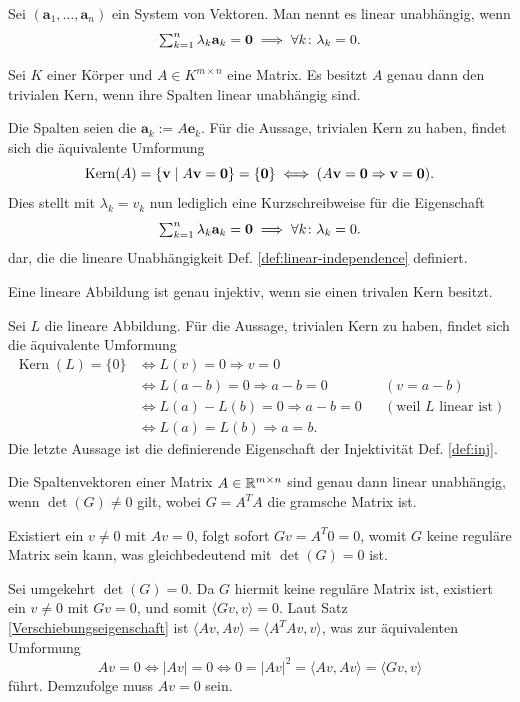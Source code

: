 \begin{Definition}\label{def:linear-independence}
Sei $(\mathbf a_1,\ldots, \mathbf a_n)$ ein System von Vektoren.
Man nennt es linear unabhängig, wenn
\[\textstyle\sum_{k=1}^n \lambda_k\mathbf{a}_k = \mathbf{0}
\implies \forall k\colon\lambda_k = 0.\]
\end{Definition}

\begin{Satz}
Sei $K$ einer Körper und $A\in K^{m\times n}$ eine Matrix. Es besitzt
$A$ genau dann den trivialen Kern, wenn ihre Spalten linear
unabhängig sind.
\end{Satz}
\begin{Beweis} Die Spalten seien die $\mathbf a_k := A\mathbf e_k$.
Für die Aussage, trivialen Kern zu haben, findet sich die
äquivalente Umformung
\[\operatorname{Kern}(A) = \{\mathbf v\mid A\mathbf{v} = \mathbf{0}\} = \{\mathbf{0}\}
\iff (A\mathbf{v} = \mathbf{0} \Rightarrow \mathbf{v} = \mathbf{0}).\]
Dies stellt mit $\lambda_k = v_k$ nun lediglich eine Kurzschreibweise
für die Eigenschaft
\[\textstyle\sum_{k=1}^n \lambda_k\mathbf{a}_k = \mathbf{0}\implies \forall k\colon\lambda_k = 0.\]
dar, die die lineare Unabhängigkeit Def. \ref{def:linear-independence}
definiert.\,\qedsymbol
\end{Beweis}

\begin{Satz}
Eine lineare Abbildung ist genau injektiv, wenn sie einen trivalen
Kern besitzt.
\end{Satz}
\begin{Beweis} Sei $L$ die lineare Abbildung. Für die Aussage,
trivialen Kern zu haben, findet sich die äquivalente Umformung
\begin{align*}
\operatorname{Kern}(L) = \{0\}
&\iff L(v) = 0\Rightarrow v = 0\\
&\iff L(a-b) = 0\Rightarrow a - b = 0 && (v = a - b)\\
&\iff L(a) - L(b) = 0\Rightarrow a - b = 0 && (\text{weil $L$ linear ist})\\
&\iff L(a) = L(b) \Rightarrow a = b.
\end{align*}
Die letzte Aussage ist die definierende Eigenschaft
der Injektivität Def. \ref{def:inj}.\,\qedsymbol
\end{Beweis}

\begin{Satz}\label{gram-det-nonzero}
Die Spaltenvektoren einer Matrix $A\in\mathbb R^{m\times n}$ sind
genau dann linear unabhängig, wenn $\det(G)\ne 0$ gilt, wobei
$G=A^T A$ die gramsche Matrix ist.
\end{Satz}
\begin{Beweis}
Existiert ein $v\ne 0$ mit $Av = 0$, folgt sofort $Gv = A^T 0 = 0$,
womit $G$ keine reguläre Matrix sein kann, was gleichbedeutend
mit $\det(G)=0$ ist.

Sei umgekehrt $\det(G)=0$. Da $G$ hiermit keine reguläre Matrix ist,
existiert ein $v\ne 0$ mit $Gv=0$, und somit $\langle Gv,v\rangle = 0$.
Laut Satz \ref{Verschiebungseigenschaft}
ist $\langle Av,Av\rangle = \langle A^T A v,v\rangle$, was zur äquivalenten
Umformung
\[Av = 0\iff |Av| = 0\iff 0 = |Av|^2 = \langle Av,Av\rangle = \langle Gv,v\rangle\]
führt. Demzufolge muss $Av = 0$ sein.\,\qedsymbol
\end{Beweis}

